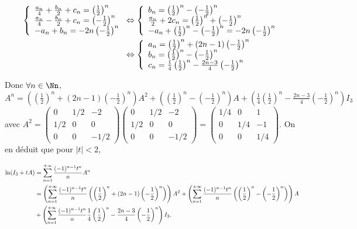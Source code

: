 {{\begin{align*}\ensuremath
\left\{
\begin{array}{l}
 \frac{a_n}{4}+ \frac{b_n}{2}+c_n=\left( \frac{1}{2}\right)^n\\
 \frac{a_n}{4}- \frac{b_n}{2}+c_n=\left(- \frac{1}{2}\right)^n\\
-a_n+b_n=-2n\left(- \frac{1}{2}\right)^{n}
\end{array}
\right.&\Leftrightarrow\left\{
\begin{array}{l}
b_n=\left( \frac{1}{2}\right)^n-\left(- \frac{1}{2}\right)^n\\
 \frac{a_n}{2}+2c_n=\left( \frac{1}{2}\right)^n+\left(- \frac{1}{2}\right)^n\\
-a_n+\left( \frac{1}{2}\right)^n-\left(- \frac{1}{2}\right)^n=-2n\left(- \frac{1}{2}\right)^{n}
\end{array}
\right.
\\
 &\Leftrightarrow\left\{
\begin{array}{l}
a_n=\left( \frac{1}{2}\right)^n+(2n-1)\left(- \frac{1}{2}\right)^n\\
b_n=\left( \frac{1}{2}\right)^n-\left(- \frac{1}{2}\right)^n\\
c_n= \frac{1}{4}\left( \frac{1}{2}\right)^n- \frac{2n-3}{4}\left(- \frac{1}{2}\right)^n
\end{array}
\right.
\end{align*}

Donc $\forall n\in\Nn$, $A^n=\left(\left( \frac{1}{2}\right)^n+(2n-1)\left(- \frac{1}{2}\right)^n\right)A^2+\left(\left( \frac{1}{2}\right)^n-\left(- \frac{1}{2}\right)^n\right)A+\left( \frac{1}{4}\left( \frac{1}{2}\right)^n- \frac{2n-3}{4}\left(- \frac{1}{2}\right)^n\right)I_3$ avec $A^2=\left(
\begin{array}{ccc}
0&1/2&-2\\
1/2&0&0\\
0&0&-1/2
\end{array}
\right)\left(
\begin{array}{ccc}
0&1/2&-2\\
1/2&0&0\\
0&0&-1/2
\end{array}
\right)=\left(
\begin{array}{ccc}
1/4&0&1\\
0&1/4&-1\\
0&0&1/4
\end{array}
\right)$. On en déduit que pour $|t|<2$,

\begin{align*}\ensuremath
\ln(I_3+tA)&=\sum_{n=1}^{+\infty} \frac{(-1)^{n-1}t^n}{n}A^n\\
 &=\left(\sum_{n=1}^{+\infty} \frac{(-1)^{n-1}t^n}{n}\left(\left( \frac{1}{2}\right)^n+(2n-1)\left(- \frac{1}{2}\right)^n\right)\right)A^2+\left(\sum_{n=1}^{+\infty} \frac{(-1)^{n-1}t^n}{n}\left(\left( \frac{1}{2}\right)^n-\left(- \frac{1}{2}\right)^n\right)\right)A\\
  &+\left(\sum_{n=1}^{+\infty} \frac{(-1)^{n-1}t^n}{n} \frac{1}{4}\left( \frac{1}{2}\right)^n- \frac{2n-3}{4}\left(- \frac{1}{2}\right)^n\right)I_3.
\end{align*}

}}
